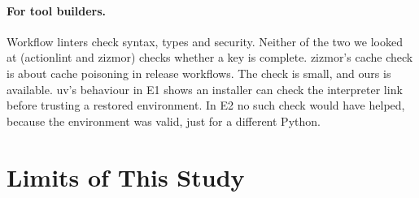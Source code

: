 \documentclass[10pt,a4paper]{article}
\begin{document}
\paragraph{For tool builders.} Workflow linters check syntax, types and
security. Neither of the two we looked at (actionlint and zizmor) checks
whether a key is complete. zizmor's cache check is about cache poisoning in
release workflows. The check is small, and ours is available. uv's behaviour
in E1 shows an installer can check the interpreter link before trusting a
restored environment. In E2 no such check would have helped, because the
environment was valid, just for a different Python.

\section{Limits of This Study}
\end{document}
